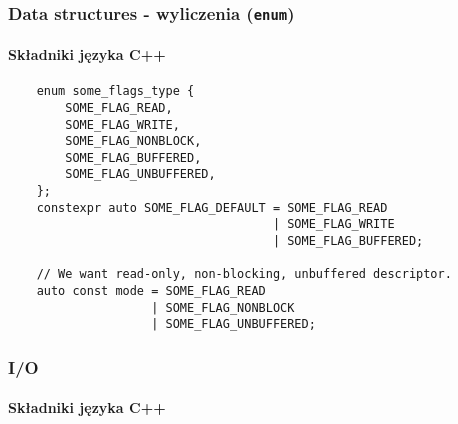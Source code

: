\documentclass[aspectratio=169]{beamer}
\begin{document}
\begin{frame}[fragile]
    \frametitle{Data structures - wyliczenia ({\tt enum})}
    \framesubtitle{Składniki języka C++}

    {\scriptsize
    \begin{lstlisting}
    enum some_flags_type {
        SOME_FLAG_READ,
        SOME_FLAG_WRITE,
        SOME_FLAG_NONBLOCK,
        SOME_FLAG_BUFFERED,
        SOME_FLAG_UNBUFFERED,
    };
    constexpr auto SOME_FLAG_DEFAULT = SOME_FLAG_READ
                                     | SOME_FLAG_WRITE
                                     | SOME_FLAG_BUFFERED;

    // We want read-only, non-blocking, unbuffered descriptor.
    auto const mode = SOME_FLAG_READ
                    | SOME_FLAG_NONBLOCK
                    | SOME_FLAG_UNBUFFERED;
    \end{lstlisting}}
\end{frame}

\begin{frame}
    \frametitle{I/O}
    \framesubtitle{Składniki języka C++}
\end{frame}
\end{document}
